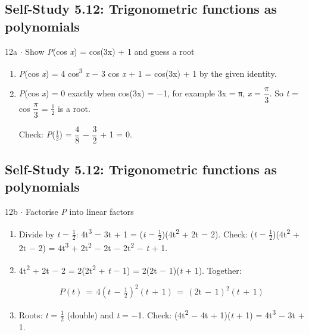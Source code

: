\documentclass[11pt]{article}
\begin{document}
\begin{keepsection}\subsection{Self-Study 5.12: Trigonometric functions as polynomials}

\begin{workedbox}{12a \ensuremath{\cdot} Show \textit{P}(cos \textit{x}) = cos(3x) + 1 and guess a root}
\begin{enumerate}
\item \textit{P}(cos \textit{x}) = 4 cos\textsuperscript{3} \textit{x} \ensuremath{-} 3 cos \textit{x} + 1 = cos(3x) + 1 by the given identity.
\item {}
\textit{P}(cos \textit{x}) = 0 exactly when cos(3x) = \ensuremath{-}1, for example 3x = π, \textit{x} = {\small\ensuremath{\dfrac{π}{3}}}. So \textit{t} = cos {\small\ensuremath{\dfrac{π}{3}}} = \ensuremath{\tfrac12} is a root.

Check: \textit{P}(\ensuremath{\tfrac12}) = {\small\ensuremath{\dfrac{4}{8}}} \ensuremath{-} {\small\ensuremath{\dfrac{3}{2}}} + 1 = 0.
\end{enumerate}
\end{workedbox}

\end{keepsection}
\begin{keepsection}\subsection{Self-Study 5.12: Trigonometric functions as polynomials}

\begin{workedbox}{12b \ensuremath{\cdot} Factorise \textit{P} into linear factors}
\begin{enumerate}
\item Divide by \textit{t} \ensuremath{-} \ensuremath{\tfrac12}: 4t\textsuperscript{3} \ensuremath{-} 3t + 1 = (\textit{t} \ensuremath{-} \ensuremath{\tfrac12})(4t\textsuperscript{2} + 2t \ensuremath{-} 2). Check: (\textit{t} \ensuremath{-} \ensuremath{\tfrac12})(4t\textsuperscript{2} + 2t \ensuremath{-} 2) = 4t\textsuperscript{3} + 2t\textsuperscript{2} \ensuremath{-} 2t \ensuremath{-} 2t\textsuperscript{2} \ensuremath{-} \textit{t} + 1.
\item {}
4t\textsuperscript{2} + 2t \ensuremath{-} 2 = 2(2t\textsuperscript{2} + \textit{t} \ensuremath{-} 1) = 2(2t \ensuremath{-} 1)(\textit{t} + 1). Together:

\begin{equation*}{P}({t})\, =\, 4({t}\, -\, \tfrac{1}{2})^{2}({t}\, +\, 1)\, =\, (2\mathrm{t}\, -\, 1)^{2}({t}\, +\, 1)\end{equation*}
\item Roots: \textit{t} = \ensuremath{\tfrac12} (double) and \textit{t} = \ensuremath{-}1. Check: (4t\textsuperscript{2} \ensuremath{-} 4t + 1)(\textit{t} + 1) = 4t\textsuperscript{3} \ensuremath{-} 3t + 1.
\end{enumerate}
\end{workedbox}

\end{keepsection}
\end{document}
